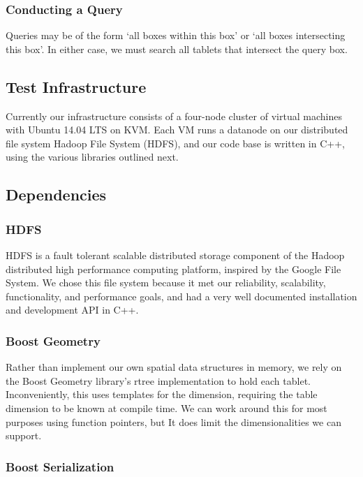 \documentclass[11pt]{article}
\begin{document}
\subsubsection{Conducting a Query}

Queries may be of the form `all boxes within this box' or `all boxes intersecting this box'. In either case, we must search all tablets that intersect the query box. 

\subsection{Test Infrastructure}

Currently our infrastructure consists of a four-node cluster of virtual machines with Ubuntu 14.04 LTS on KVM. Each VM runs a datanode on our distributed file system Hadoop File System (HDFS), and our code base is written in C++, using the various libraries outlined next.

\subsection{Dependencies}

\subsubsection{HDFS}

HDFS is a fault tolerant scalable distributed storage component of the Hadoop distributed high performance computing platform, inspired by the Google File System. We chose this file system because it met our reliability, scalability, functionality, and performance goals, and had a very well documented installation and development API in C++. 

\subsubsection{Boost Geometry}

Rather than implement our own spatial data structures in memory, we rely on the Boost Geometry library's rtree implementation to hold each tablet. Inconveniently, this uses templates for the dimension, requiring the table dimension to be known at compile time. We can work around this for most purposes using function pointers, but It does limit the dimensionalities we can support.

\subsubsection{Boost Serialization}
\end{document}
